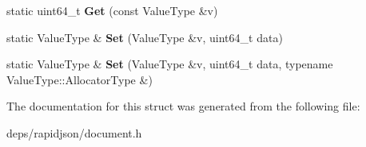 \begin{DoxyCompactItemize}
\item 
static uint64\+\_\+t {\bfseries Get} (const Value\+Type \&v)\hypertarget{structinternal_1_1_type_helper_3_01_value_type_00_01uint64__t_01_4_a1b1b2e4fe3c38fb37701284c6571ee92}{}\label{structinternal_1_1_type_helper_3_01_value_type_00_01uint64__t_01_4_a1b1b2e4fe3c38fb37701284c6571ee92}

\item 
static Value\+Type \& {\bfseries Set} (Value\+Type \&v, uint64\+\_\+t data)\hypertarget{structinternal_1_1_type_helper_3_01_value_type_00_01uint64__t_01_4_a38392035fe5a647078b24f0e15a84145}{}\label{structinternal_1_1_type_helper_3_01_value_type_00_01uint64__t_01_4_a38392035fe5a647078b24f0e15a84145}

\item 
static Value\+Type \& {\bfseries Set} (Value\+Type \&v, uint64\+\_\+t data, typename Value\+Type\+::\+Allocator\+Type \&)\hypertarget{structinternal_1_1_type_helper_3_01_value_type_00_01uint64__t_01_4_a3c8b01c3e9a9e63c99bef2db9fdf3823}{}\label{structinternal_1_1_type_helper_3_01_value_type_00_01uint64__t_01_4_a3c8b01c3e9a9e63c99bef2db9fdf3823}

\end{DoxyCompactItemize}


The documentation for this struct was generated from the following file\+:\begin{DoxyCompactItemize}
\item 
deps/rapidjson/document.\+h\end{DoxyCompactItemize}
